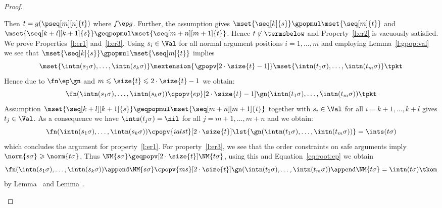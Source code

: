 \documentclass{LMCS}
\begin{document}
\begin{proof}
\begin{description}[leftmargin=0.3cm]
  \item[\dcase{$s \cpop{ep} t$}]
    Then $t = g(\pseq[m][n]{t})$ where $f \ep g$.
    Further, the assumption gives
    $\mset{\seq[k]{s}} \gpopmul \mset{\seq[m]{t}}$
    and $\mset{\seq[k+l][k+1]{s}} \geqpopmul \mset{\seq[m+n][m+1]{t}}$.
    Hence $t \not \in \termsbelow$ and Property~\ref{l:er2} is vacuously 
    satisfied. 
    We prove Properties~\ref{l:er1} and~\ref{l:er3}.
    Using $s_i \in \Val$ for all normal argument positions $i = 1,\dots,m$
    and employing Lemma~\ref{l:gpop:val} we see that
    $\mset{\seq[k]{s}} \gpopmul \mset{\seq[m]{t}}$ implies
\begin{equation*}
      \mset{\intn(s_1\sigma), \dots, \intn(s_k\sigma)} \mextension{\gpopv[2\cdot\size{t}-1]} \mset{\intn(t_1\sigma), \dots, \intn(t_m\sigma)}
      \tpkt
    \end{equation*}
Hence due to 
    $\fn \ep \gn$ and $m \leqslant \size{t} \leqslant 2\cdot\size{t} - 1$
    we obtain:
    \begin{equation}
      \label{eq:root:ep}
      \fn(\intn(s_1\sigma), \dots, \intn(s_k\sigma)) \cpopv{ep}[2\cdot\size{t} -1] \gn(\intn(t_1\sigma), \dots, \intn(t_m\sigma))
      \tpkt
    \end{equation}
Assumption $\mset{\seq[k+l][k+1]{s}} \geqpopmul \mset{\seq[m+n][m+1]{t}}$ together with
    $s_i \in \Val$ for all $i = k+1,\dots,k+l$ gives
    $t_j \in \Val$. As a consequence we have $\ints(t_j\sigma) = \nil$ for all
    $j=m+1,\dots,m+n$ and we obtain:
$$
    \fn(\intn(s_1\sigma), \dots, \intn(s_k\sigma)) \cpopv{ialst}[2\cdot\size{t}] 
    \lst{\gn(\intn(t_1\sigma), \dots, \intn(t_m\sigma))} = \ints(t\sigma) 
    $$
    which concludes the argument for property~\ref{l:er1}.
For property~\ref{l:er3}, 
    we see that the order constraints on safe arguments 
    imply $\norm{s\sigma} \geqslant \norm{t\sigma}$. 
    Thus $\NM{s\sigma} \geqpopv[2\cdot\size{t}] \NM{t\sigma}$, 
    using this and Equation~\eqref{eq:root:ep} we obtain 
    $$\fn(\intn(s_1\sigma), \dots, \intn(s_k\sigma)) \append \NM{s\sigma} 
    \cpopv{ms}[2\cdot\size{t}]  \gn(\intn(t_1\sigma), \dots, \intn(t_m\sigma)) \append \NM{t\sigma} = \intn(t\sigma)
    \tkom
    $$
    by Lemma~ and Lemma~.\qedhere
  \end{description}
\end{proof}
\end{document}
